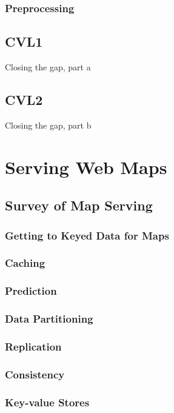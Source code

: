\documentclass[11pt, oneside]{report}   	%
\begin{document}
\section{Preprocessing}

\chapter{CVL1}
Closing the gap, part a

\chapter{CVL2} 
Closing the gap, part b

\part{Serving Web Maps}

\chapter{Survey of Map Serving}

\section{Getting to Keyed Data for Maps}

\section{Caching}

\section{Prediction}

\section{Data Partitioning}

\section{Replication}

\section{Consistency}

\section{Key-value Stores}
\end{document}
